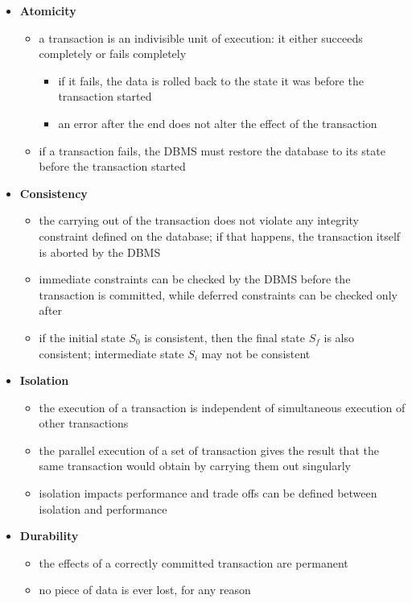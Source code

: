 \documentclass[english]{article}
\begin{document}
\begin{itemize}
  \item \textbf{Atomicity}
        \begin{itemize}
          \item a transaction is an indivisible unit of execution: it either succeeds completely or fails completely
                \begin{itemize}
                  \item if it fails, the data is rolled back to the state it was before the transaction started
                  \item an error after the end does not alter the effect of the transaction
                \end{itemize}
          \item if a transaction fails, the DBMS must restore the database to its state before the transaction started
        \end{itemize}
  \item \textbf{Consistency}
        \begin{itemize}
          \item the carrying out of the transaction does not violate any integrity constraint defined on the database; if that happens, the transaction itself is aborted by the DBMS
          \item immediate constraints can be checked by the DBMS before the transaction is committed, while deferred constraints can be checked only after
          \item if the initial state \(S_0\) is consistent, then the final state \(S_f\) is also consistent; intermediate state \(S_i\) may not be consistent
        \end{itemize}
  \item \textbf{Isolation}
        \begin{itemize}
          \item the execution of a transaction is independent of simultaneous execution of other transactions
          \item the parallel execution of a set of transaction gives the result that the same transaction would obtain by carrying them out singularly
          \item isolation impacts performance and trade offs can be defined between isolation and performance
        \end{itemize}
  \item \textbf{Durability}
        \begin{itemize}
          \item the effects of a correctly committed transaction are permanent
          \item no piece of data is ever lost, for any reason
        \end{itemize}
\end{itemize}
\end{document}
